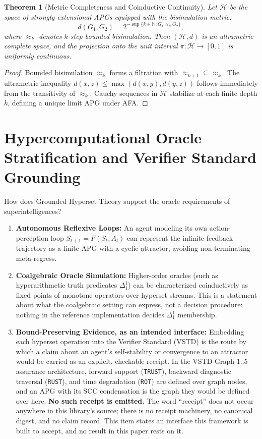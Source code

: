 \documentclass[11pt]{article}
\newtheorem{theorem}{Theorem}[section]
\theoremstyle{definition}
\newcommand{\N}{\mathbb N}
\begin{document}
\begin{theorem}[Metric Completeness and Coinductive Continuity]
Let $\mathcal{H}$ be the space of strongly extensional APGs equipped with the bisimulation metric:
\[
d(G_1, G_2) = 2^{-\sup \{k \in \N : G_1 \approx_k G_2\}},
\]
where $\approx_k$ denotes $k$-step bounded bisimulation. Then $(\mathcal{H}, d)$ is an ultrametric complete space, and the projection onto the unit interval $\pi\colon \mathcal{H} \to [0, 1]$ is uniformly continuous.
\end{theorem}
\begin{proof}
Bounded bisimulation $\approx_k$ forms a filtration with $\approx_{k+1} \subseteq \approx_k$. The ultrametric inequality $d(x, z) \le \max(d(x, y), d(y, z))$ follows immediately from the transitivity of $\approx_k$. Cauchy sequences in $\mathcal{H}$ stabilize at each finite depth $k$, defining a unique limit APG under AFA.
\end{proof}

\section{Hypercomputational Oracle Stratification and Verifier Standard Grounding}
How does Grounded Hyperset Theory support the oracle requirements of superintelligences?
\begin{enumerate}
\item \textbf{Autonomous Reflexive Loops:} An agent modeling its own action-perception loop $S_{t+1} = F(S_t, A_t)$ can represent the infinite feedback trajectory as a finite APG with a cyclic attractor, avoiding non-terminating meta-regress.
\item \textbf{Coalgebraic Oracle Simulation:} Higher-order oracles (such as hyperarithmetic truth predicates $\Delta^1_1$) can be characterized coinductively as fixed points of monotone operators over hyperset streams. This is a statement about what the coalgebraic setting can express, not a decision procedure: nothing in the reference implementation decides $\Delta^1_1$ membership.
\item \textbf{Bound-Preserving Evidence, as an intended interface:} Embedding each hyperset operation into the Verifier Standard (VSTD) is the route by which a claim about an agent's self-stability or convergence to an attractor would be carried as an explicit, checkable receipt. In the VSTD-Graph-1..5 assurance architecture, forward support (\texttt{TRUST}), backward diagnostic traversal (\texttt{RUST}), and time degradation (\texttt{ROT}) are defined over graph nodes, and an APG with its SCC condensation is the graph they would be defined over here. \textbf{No such receipt is emitted.} The word ``receipt'' does not occur anywhere in this library's source; there is no receipt machinery, no canonical digest, and no claim record. This item states an interface this framework is built to accept, and no result in this paper rests on it.
\end{enumerate}
\end{document}
